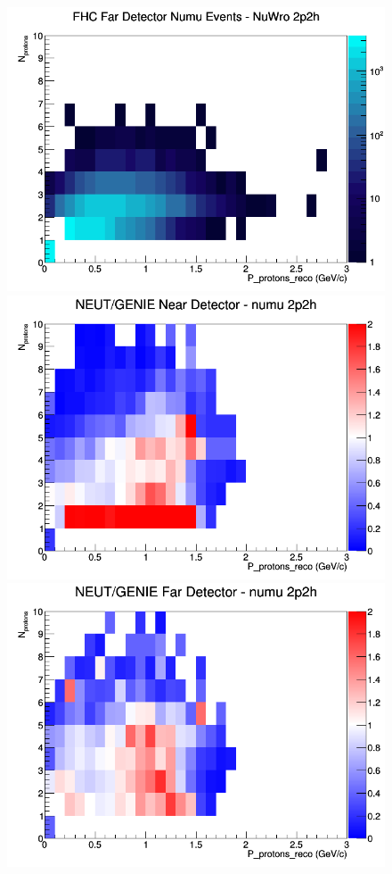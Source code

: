 \documentclass[12pt]{article}
\begin{document}
\begin{figure}[h]
\endminipage
{}
\includegraphics[width=\linewidth]{eff_N_P/GAr/protons/2p2h_FHC_FD_numu_N_P_NuWro.png}
\endminipage
\newline
{}
\includegraphics[width=\linewidth]{eff_N_P/GAr/protons/ratios/2p2h_NEUT_GENIE_numu_near_N_P.png}
\endminipage
{}
\includegraphics[width=\linewidth]{eff_N_P/GAr/protons/ratios/2p2h_NEUT_GENIE_numu_far_N_P.png}

\end{figure}
\end{document}
